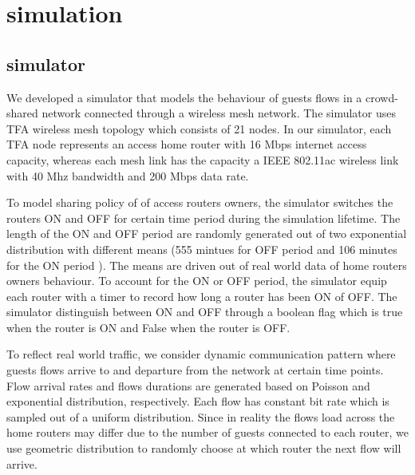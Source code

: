 \section{simulation}
\label{sec:simulation}

\subsection{simulator}
We developed a simulator that models the behaviour of guests flows in a crowd-shared network connected through a wireless mesh network. The simulator uses TFA wireless mesh topology which consists of 21 nodes. In our simulator, each TFA node represents an access home router with 16 Mbps internet access capacity, whereas each mesh link has the capacity a IEEE 802.11ac wireless link with 40 Mhz bandwidth and 200 Mbps data rate. 

To model sharing policy of of access routers owners, the simulator switches the routers ON and OFF for certain time period during the simulation lifetime. The length of the ON and OFF period are randomly generated out of two exponential distribution with different means (555 mintues for OFF period and 106 minutes for the ON period ). The means are driven out of real world data of home routers owners behaviour. To account for the ON or OFF period, the simulator equip each router with a timer to record how long a router has been ON of OFF. The simulator distinguish between ON and OFF through a boolean flag which is true when the router is ON and False when the router is OFF. 

To reflect real world traffic, we consider dynamic communication pattern where guests flows arrive to and departure from the network at certain time points. Flow arrival rates and flows durations are generated based on Poisson and exponential distribution, respectively. Each flow has constant bit rate which is sampled out of a uniform distribution. Since in reality the flows load across the home routers may differ due to the number of guests connected to each router, we use geometric distribution to randomly choose at which router the next flow will arrive. 

